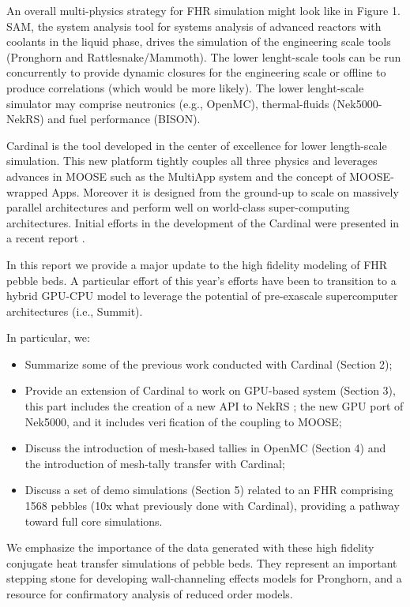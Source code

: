 An overall multi-physics strategy for FHR simulation might look like in Figure 1. SAM, the system analysis tool for systems analysis of advanced reactors with coolants in the liquid phase, drives the simulation of the engineering scale tools (Pronghorn and Rattlesnake/Mammoth). The lower lenght-scale tools can be run concurrently to provide dynamic closures for the engineering scale or offline to produce correlations (which would be more likely). The lower lenght-scale simulator may comprise neutronics (e.g., OpenMC), thermal-fluids (Nek5000-NekRS) and fuel performance (BISON).

Cardinal is the tool developed in the center of excellence for
lower length-scale simulation. This new platform tightly couples all three physics and leverages advances in MOOSE \cite{gaston2009moose} such as the MultiApp system and the concept of MOOSE-wrapped Apps. Moreover it is designed from the ground-up to scale on massively parallel architectures and perform well on world-class
super-computing architectures. Initial efforts in the development of the Cardinal were presented in a recent report \cite{cardinal}.

In this report we provide a major update to the high fidelity modeling of FHR pebble beds. A particular effort of this year's efforts have been to transition to a hybrid GPU-CPU model to leverage the potential of pre-exascale supercomputer architectures (i.e., Summit).

In particular, we:
\begin{itemize}
\item Summarize some of the previous work conducted with Cardinal (Section 2);
\item Provide an extension of Cardinal to work on GPU-based system (Section 3), this part includes the creation of a new API to NekRS \cite{toward}; the new GPU port of Nek5000, and it includes  verification of the coupling to MOOSE;
\item Discuss the introduction of mesh-based tallies in OpenMC (Section 4) and the introduction of mesh-tally transfer with Cardinal;
\item Discuss a set of demo simulations (Section 5) related to an FHR comprising 1568 pebbles (10x what previously done with Cardinal), providing a pathway toward full core simulations.
\end{itemize}

We emphasize the importance of the data generated with these high fidelity conjugate heat transfer simulations of pebble beds. They represent an important stepping stone for developing wall-channeling effects models for Pronghorn, and a resource for confirmatory analysis of reduced order models.
